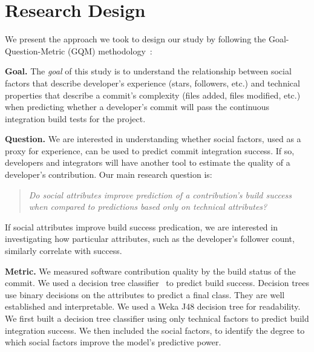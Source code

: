 \documentclass[10pt, conference]{IEEEtran}
\begin{document}
\section{Research Design}

We present the approach we took to design our study by
following the Goal-Question-Metric (GQM) methodology~\cite{Basili84}:

\vspace{1ex}
\noindent\textbf{Goal.}
The \emph{goal} of this study is to understand the relationship 
between social factors that describe 
developer's experience (stars, followers, etc.) and technical properties that
describe a commit's complexity
(files added, files modified, etc.)
when predicting whether a developer's commit
will pass the continuous integration build tests for the project.

\vspace{1ex}
\noindent\textbf{Question.}
We are interested in understanding whether
social factors, used as a proxy for experience, can be used to predict
commit integration success. If so, 
developers and integrators will have another tool to estimate the quality
of a developer's contribution.
%
Our main research question is:

\begin{quotation}
\noindent\emph{Do social attributes
improve prediction of a contribution's build success when compared to
predictions based only on technical attributes?}
\end{quotation}

If social attributes improve build success predication, we are
interested in investigating how particular attributes, such as the developer's
follower count, similarly correlate with success.

\vspace{1ex}
\noindent\textbf{Metric.} We measured software contribution quality by the
build status of the
commit. We used a decision tree classifier~\cite{Quinlan86} to predict build 
success. Decision trees 
use binary decisions on the
attributes to predict a final class. They are well
established and interpretable. We used a Weka J48 decision tree for readability.
We first built a
decision tree classifier using only technical factors to 
predict build integration
success.  We then included the social factors, to 
identify the degree to which social factors improve the model's predictive
power.
\end{document}
